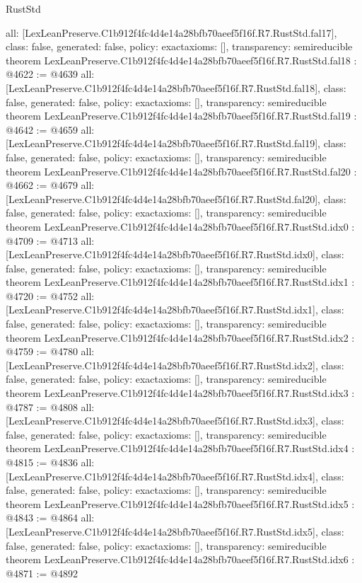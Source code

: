 \begin{lexlean}{RustStd}
\begin{coremodule}
{  all: [LexLeanPreserve.C1b912f4fc4d4e14a28bfb70aeef5f16f.R7.RustStd.fal17],
  class: false,
  generated: false,
  policy: exact{axioms: []},
  transparency: semireducible
}
theorem LexLeanPreserve.C1b912f4fc4d4e14a28bfb70aeef5f16f.R7.RustStd.fal18 : @4622 := @4639 {
  all: [LexLeanPreserve.C1b912f4fc4d4e14a28bfb70aeef5f16f.R7.RustStd.fal18],
  class: false,
  generated: false,
  policy: exact{axioms: []},
  transparency: semireducible
}
theorem LexLeanPreserve.C1b912f4fc4d4e14a28bfb70aeef5f16f.R7.RustStd.fal19 : @4642 := @4659 {
  all: [LexLeanPreserve.C1b912f4fc4d4e14a28bfb70aeef5f16f.R7.RustStd.fal19],
  class: false,
  generated: false,
  policy: exact{axioms: []},
  transparency: semireducible
}
theorem LexLeanPreserve.C1b912f4fc4d4e14a28bfb70aeef5f16f.R7.RustStd.fal20 : @4662 := @4679 {
  all: [LexLeanPreserve.C1b912f4fc4d4e14a28bfb70aeef5f16f.R7.RustStd.fal20],
  class: false,
  generated: false,
  policy: exact{axioms: []},
  transparency: semireducible
}
theorem LexLeanPreserve.C1b912f4fc4d4e14a28bfb70aeef5f16f.R7.RustStd.idx0 : @4709 := @4713 {
  all: [LexLeanPreserve.C1b912f4fc4d4e14a28bfb70aeef5f16f.R7.RustStd.idx0],
  class: false,
  generated: false,
  policy: exact{axioms: []},
  transparency: semireducible
}
theorem LexLeanPreserve.C1b912f4fc4d4e14a28bfb70aeef5f16f.R7.RustStd.idx1 : @4720 := @4752 {
  all: [LexLeanPreserve.C1b912f4fc4d4e14a28bfb70aeef5f16f.R7.RustStd.idx1],
  class: false,
  generated: false,
  policy: exact{axioms: []},
  transparency: semireducible
}
theorem LexLeanPreserve.C1b912f4fc4d4e14a28bfb70aeef5f16f.R7.RustStd.idx2 : @4759 := @4780 {
  all: [LexLeanPreserve.C1b912f4fc4d4e14a28bfb70aeef5f16f.R7.RustStd.idx2],
  class: false,
  generated: false,
  policy: exact{axioms: []},
  transparency: semireducible
}
theorem LexLeanPreserve.C1b912f4fc4d4e14a28bfb70aeef5f16f.R7.RustStd.idx3 : @4787 := @4808 {
  all: [LexLeanPreserve.C1b912f4fc4d4e14a28bfb70aeef5f16f.R7.RustStd.idx3],
  class: false,
  generated: false,
  policy: exact{axioms: []},
  transparency: semireducible
}
theorem LexLeanPreserve.C1b912f4fc4d4e14a28bfb70aeef5f16f.R7.RustStd.idx4 : @4815 := @4836 {
  all: [LexLeanPreserve.C1b912f4fc4d4e14a28bfb70aeef5f16f.R7.RustStd.idx4],
  class: false,
  generated: false,
  policy: exact{axioms: []},
  transparency: semireducible
}
theorem LexLeanPreserve.C1b912f4fc4d4e14a28bfb70aeef5f16f.R7.RustStd.idx5 : @4843 := @4864 {
  all: [LexLeanPreserve.C1b912f4fc4d4e14a28bfb70aeef5f16f.R7.RustStd.idx5],
  class: false,
  generated: false,
  policy: exact{axioms: []},
  transparency: semireducible
}
theorem LexLeanPreserve.C1b912f4fc4d4e14a28bfb70aeef5f16f.R7.RustStd.idx6 : @4871 := @4892 {
}
\end{coremodule}
\end{lexlean}
